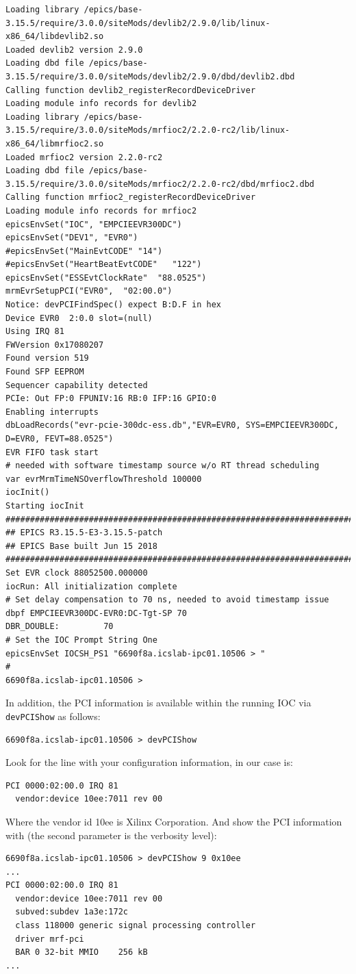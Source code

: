 \documentclass[11pt
  , a4paper
  , article
  , oneside
  , showtrims
]{memoir}
\begin{document}
{\begin{lstlisting}[style=termstyle]
Loading library /epics/base-3.15.5/require/3.0.0/siteMods/devlib2/2.9.0/lib/linux-x86_64/libdevlib2.so
Loaded devlib2 version 2.9.0
Loading dbd file /epics/base-3.15.5/require/3.0.0/siteMods/devlib2/2.9.0/dbd/devlib2.dbd
Calling function devlib2_registerRecordDeviceDriver
Loading module info records for devlib2
Loading library /epics/base-3.15.5/require/3.0.0/siteMods/mrfioc2/2.2.0-rc2/lib/linux-x86_64/libmrfioc2.so
Loaded mrfioc2 version 2.2.0-rc2
Loading dbd file /epics/base-3.15.5/require/3.0.0/siteMods/mrfioc2/2.2.0-rc2/dbd/mrfioc2.dbd
Calling function mrfioc2_registerRecordDeviceDriver
Loading module info records for mrfioc2
epicsEnvSet("IOC", "EMPCIEEVR300DC")
epicsEnvSet("DEV1", "EVR0")
#epicsEnvSet("MainEvtCODE" "14")
#epicsEnvSet("HeartBeatEvtCODE"   "122")
epicsEnvSet("ESSEvtClockRate"  "88.0525")
mrmEvrSetupPCI("EVR0",  "02:00.0")
Notice: devPCIFindSpec() expect B:D.F in hex
Device EVR0  2:0.0 slot=(null)
Using IRQ 81
FWVersion 0x17080207
Found version 519
Found SFP EEPROM
Sequencer capability detected
PCIe: Out FP:0 FPUNIV:16 RB:0 IFP:16 GPIO:0
Enabling interrupts
dbLoadRecords("evr-pcie-300dc-ess.db","EVR=EVR0, SYS=EMPCIEEVR300DC, D=EVR0, FEVT=88.0525")
EVR FIFO task start
# needed with software timestamp source w/o RT thread scheduling
var evrMrmTimeNSOverflowThreshold 100000
iocInit()
Starting iocInit
############################################################################
## EPICS R3.15.5-E3-3.15.5-patch
## EPICS Base built Jun 15 2018
############################################################################
Set EVR clock 88052500.000000
iocRun: All initialization complete
# Set delay compensation to 70 ns, needed to avoid timestamp issue
dbpf EMPCIEEVR300DC-EVR0:DC-Tgt-SP 70
DBR_DOUBLE:         70
# Set the IOC Prompt String One
epicsEnvSet IOCSH_PS1 "6690f8a.icslab-ipc01.10506 > "
#
6690f8a.icslab-ipc01.10506 >
\end{lstlisting}

In addition, the PCI information is available within the running IOC via \texttt{devPCIShow} as follows:
\begin{lstlisting}
6690f8a.icslab-ipc01.10506 > devPCIShow
\end{lstlisting}
Look for the line with your configuration information, in our case is:
\begin{lstlisting}
PCI 0000:02:00.0 IRQ 81
  vendor:device 10ee:7011 rev 00
\end{lstlisting}
Where the vendor id 10ee is Xilinx Corporation.
And show the PCI information with (the second parameter is the verbosity level):
\begin{lstlisting}
6690f8a.icslab-ipc01.10506 > devPCIShow 9 0x10ee
...
PCI 0000:02:00.0 IRQ 81
  vendor:device 10ee:7011 rev 00
  subved:subdev 1a3e:172c
  class 118000 generic signal processing controller
  driver mrf-pci
  BAR 0 32-bit MMIO    256 kB
...
\end{lstlisting}

}
\end{document}
